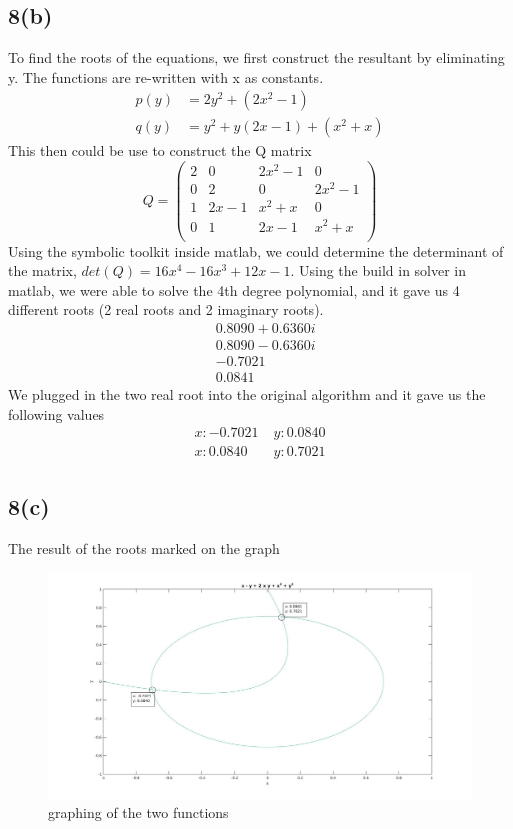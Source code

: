 \documentclass{article}
\begin{document}
\subsection{8(b)}
To find the roots of the equations, we first construct the resultant by eliminating y. The functions are re-written with x as constants.
\begin{equation*}
\begin{aligned}
p(y) &= 2y^2 + (2x^2-1)\\
q(y) &= y^2 + y(2x-1) + (x^2 +x)
\end{aligned}
\end{equation*}
This then could be use to construct the Q matrix
\begin{equation*}
Q = 
\begin{pmatrix}
2 & 0 & 2x^2-1 & 0\\
0 & 2 & 0 & 2x^2 -1 \\
1 & 2x-1 & x^2+x & 0 \\
0 & 1 & 2x-1 & x^2+x\\ 
\end{pmatrix}
\end{equation*}
Using the symbolic toolkit inside matlab, we could determine the determinant of the matrix, $det(Q) = 16x^4 - 16x^3 + 12x - 1$. Using the build in solver in matlab, we were able to solve the 4th degree polynomial, and it gave us 4 different roots (2 real roots and 2 imaginary roots).
\begin{equation*}
\begin{aligned}
   &0.8090 + 0.6360i\\
   &0.8090 - 0.6360i\\
  &-0.7021 \\
   &0.0841 
\end{aligned}
\end{equation*}
We plugged in the two real root into the original algorithm and it gave us the following values
\begin{equation*}
\begin{aligned}
	x: -0.7021 \;&y:0.0840\\
	x: 0.0840 \;&y:0.7021
\end{aligned}
\end{equation*}
\subsection{8(c)}
The result of the roots marked on the graph
\begin{figure}[H]
\centering
\includegraphics[width=5in]{p8-2.jpg}
\caption{graphing of the two functions}
\end{figure}
\end{document}
